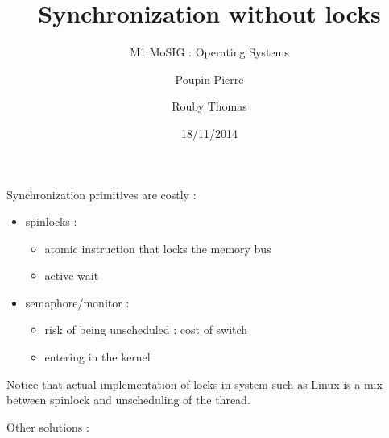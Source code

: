 \documentclass[a4paper,10pt]{article}
\title{\textbf{Synchronization without locks}}
\subtitle{M1 MoSIG : Operating Systems}
\author{Poupin Pierre \and Rouby Thomas}
\date{18/11/2014}
\begin{document}
\maketitle


Synchronization primitives are costly :
\begin{itemize}
  \item spinlocks :
  \begin{itemize}
    \item atomic instruction that locks the memory bus
    \item active wait
  \end{itemize}
  \item semaphore/monitor :
  \begin{itemize}
    \item risk of being unscheduled : cost of switch
    \item entering in the kernel
  \end{itemize}
\end{itemize}

Notice that actual implementation of locks in system such as Linux is a mix between spinlock and unscheduling of the thread.

Other solutions :
\end{document}
